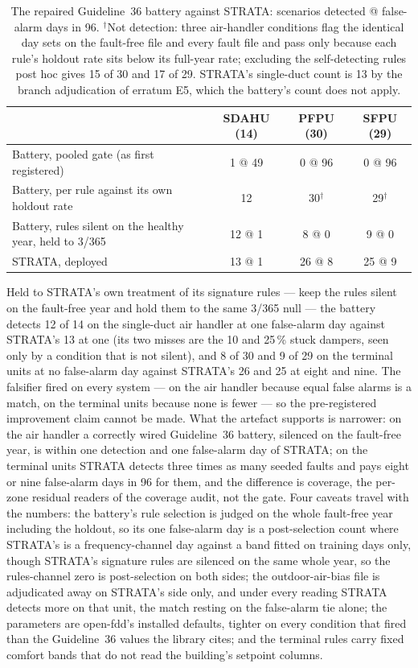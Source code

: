 \documentclass[11pt,letterpaper]{article}
\begin{document}
\begin{table}[t]
\centering
\footnotesize
\setlength{\tabcolsep}{5pt}
\begin{tabular}{@{}lccc@{}}
\hline
 & SDAHU (14) & PFPU (30) & SFPU (29) \\
\hline
Battery, pooled gate (as first registered) & 1 @ 49 & 0 @ 96 & 0 @ 96 \\
Battery, per rule against its own holdout rate & 12 & 30$^\dagger$ & 29$^\dagger$ \\
Battery, rules silent on the healthy year, held to 3/365 & 12 @ 1 & 8 @ 0 & 9 @ 0 \\
STRATA, deployed & 13 @ 1 & 26 @ 8 & 25 @ 9 \\
\hline
\end{tabular}
\caption{The repaired Guideline~36 battery against STRATA: scenarios detected @ false-alarm days in 96. $^\dagger$Not detection: three air-handler conditions flag the identical day sets on the fault-free file and every fault file and pass only because each rule's holdout rate sits below its full-year rate; excluding the self-detecting rules post hoc gives 15 of 30 and 17 of 29. STRATA's single-duct count is 13 by the branch adjudication of erratum E5, which the battery's count does not apply.}
\label{tab:g36}
\end{table}

Held to STRATA's own treatment of its signature rules --- keep the rules silent on the fault-free year and hold them to the same 3/365 null --- the battery detects 12 of 14 on the single-duct air handler at one false-alarm day against STRATA's 13 at one (its two misses are the 10 and 25\,\% stuck dampers, seen only by a condition that is not silent), and 8 of 30 and 9 of 29 on the terminal units at no false-alarm day against STRATA's 26 and 25 at eight and nine. The falsifier fired on every system --- on the air handler because equal false alarms is a match, on the terminal units because none is fewer --- so the pre-registered improvement claim cannot be made. What the artefact supports is narrower: on the air handler a correctly wired Guideline~36 battery, silenced on the fault-free year, is within one detection and one false-alarm day of STRATA; on the terminal units STRATA detects three times as many seeded faults and pays eight or nine false-alarm days in 96 for them, and the difference is coverage, the per-zone residual readers of the coverage audit, not the gate. Four caveats travel with the numbers: the battery's rule selection is judged on the whole fault-free year including the holdout, so its one false-alarm day is a post-selection count where STRATA's is a frequency-channel day against a band fitted on training days only, though STRATA's signature rules are silenced on the same whole year, so the rules-channel zero is post-selection on both sides; the outdoor-air-bias file is adjudicated away on STRATA's side only, and under every reading STRATA detects more on that unit, the match resting on the false-alarm tie alone; the parameters are open-fdd's installed defaults, tighter on every condition that fired than the Guideline~36 values the library cites; and the terminal rules carry fixed comfort bands that do not read the building's setpoint columns.
\end{document}
